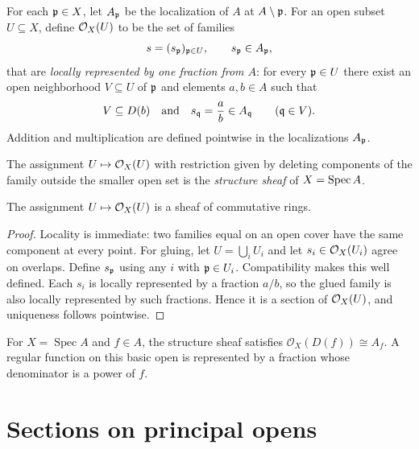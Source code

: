 For each $\mathfrak p\in X$, let $A_{\mathfrak p}$ be the localization of $A$ at
$A\setminus\mathfrak p$.  For an open subset $U\subseteq X$, define $\mathcal O_X(U)$ to be the set of
families
\[
s=(s_{\mathfrak p})_{\mathfrak p\in U},\qquad s_{\mathfrak p}\in A_{\mathfrak p},
\]
that are \emph{locally represented by one fraction from $A$}: for every
$\mathfrak p\in U$ there exist an open neighborhood $V\subseteq U$ of $\mathfrak p$ and elements
$a,b\in A$ such that
\[
V\subseteq D(b)
\quad\text{and}\quad
s_{\mathfrak q}=\frac{a}{b}\in A_{\mathfrak q}
\qquad(\mathfrak q\in V).
\]
Addition and multiplication are defined pointwise in the localizations $A_{\mathfrak p}$.

\begin{definition}
The assignment $U\mapsto\mathcal O_X(U)$ with restriction given by deleting components of the
family outside the smaller open set is the \emph{structure sheaf} of $X=\operatorname{Spec} A$.
\end{definition}



\begin{theorem}
The assignment $U\mapsto\mathcal O_X(U)$ is a sheaf of commutative rings.
\end{theorem}

\begin{proof}
Locality is immediate: two families equal on an open cover have the same component at every
point.  For gluing, let $U=\bigcup_i U_i$ and let $s_i\in\mathcal O_X(U_i)$ agree on overlaps.
Define $s_{\mathfrak p}$ using any $i$ with $\mathfrak p\in U_i$.  Compatibility makes this well defined.
Each $s_i$ is locally represented by a fraction $a/b$, so the glued family is also locally
represented by such fractions.  Hence it is a section of $\mathcal O_X(U)$, and uniqueness follows
pointwise.
\end{proof}

\begin{example}\label{ex:vi17-expand-01}
For $X=\operatorname{Spec}A$ and $f\in A$, the structure sheaf satisfies $\mathcal O_X(D(f))\cong A_f$.  A regular function on this basic open is represented by a fraction whose denominator is a power of $f$.
\end{example}
\section{Sections on principal opens}

